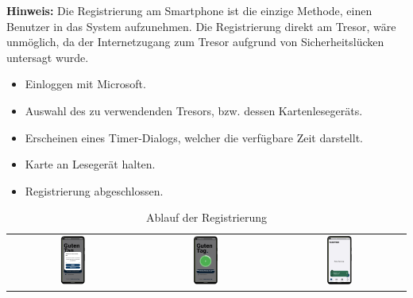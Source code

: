 {{\textbf{Hinweis:}} Die Registrierung am Smartphone ist die einzige Methode, einen Benutzer in das System aufzunehmen. Die Registrierung direkt am Tresor, wäre unmöglich, da der Internetzugang zum Tresor aufgrund von Sicherheitslücken untersagt wurde. 
\begin{itemize}
    \item Einloggen mit Microsoft.
    \item Auswahl des zu verwendenden Tresors, bzw. dessen Kartenlesegeräts.
    \item Erscheinen eines Timer-Dialogs, welcher die verfügbare Zeit darstellt.
    \item Karte an Lesegerät halten.
    \item Registrierung abgeschlossen.
\end{itemize}

   
\begin{table}[htbp]
  \centering
  \begin{tabular}{ccc}
    \includegraphics[width=0.2\textwidth]{FLUTTER/images/GP/Login_Select_Storage.png}&
    \includegraphics[width=0.2\textwidth]{FLUTTER/images/GP/Login_timer.png}&
    \includegraphics[width=0.2\textwidth]{FLUTTER/images/GP/Login_register_sucees.png}
    \\
  \end{tabular}
  \captionsetup{type=figure}
  \caption{Ablauf der Registrierung}
  \label{tab:example}
\end{table}

}

